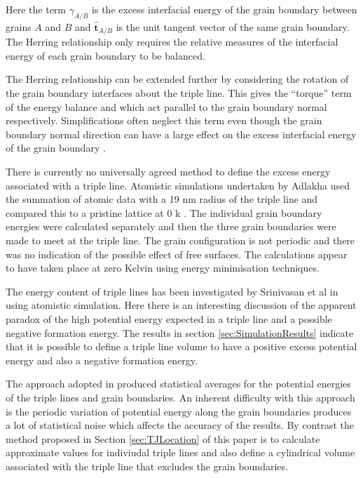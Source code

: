 \documentclass[12pt,a4paper]{book}
\begin{document}
Here the term $\gamma_{A/B}$ is the excess interfacial energy of the grain boundary between grains $A$ and $B$ and $\mathbf{\hat{t}}_{A/B}$ is the unit tangent vector of the same grain boundary. The Herring relationship only requires the relative measures of the interfacial energy of each grain boundary to be balanced.

The Herring relationship can be extended further by considering the rotation of the grain boundary interfaces about the triple line. This gives the ``torque'' term of the energy balance and which act parallel to the grain boundary normal respectively. Simplifications often neglect this term even though the grain boundary normal direction can have a large effect on the excess interfacial energy of the grain boundary \cite{Rowenhurst}.

There is currently no universally agreed method to define the excess energy associated with a triple line. Atomistic simulations undertaken by Adlakha used the summation of atomic data with a 19 nm radius of the triple line and compared this to a pristine lattice at 0 k \cite{Adlakha2015}. The individual grain boundary energies were calculated separately and then the three grain boundaries were made to meet at the triple line. The grain configuration is not periodic and there was no indication of the possible effect of free surfaces. The calculations appear to have taken place at zero Kelvin using energy minimisation techniques. 

The energy content of triple lines has been investigated by Srinivasan et al in \cite{Srinivasan1999} using atomistic simulation. Here there is an interesting discussion of the apparent paradox of the high potential energy expected in a triple line and a possible negative formation energy. The results in section \ref{sec:SimulationResults}  indicate that it is possible to define a triple line volume to have a positive excess potential energy and also a negative formation energy. 

The approach adopted in \cite{Srinivasan1999}   
produced statistical averages for the potential energies of the triple lines and grain boundaries. An inherent difficulty with this approach is the periodic variation of potential energy along the grain boundaries produces a lot of statistical noise which affects the accuracy of the results. By contrast the method proposed in Section \ref{sec:TJLocation} of this paper is to calculate approximate values for indiviudal triple lines and also define a cylindrical volume associated with the triple line that excludes the grain boundaries.
\end{document}
